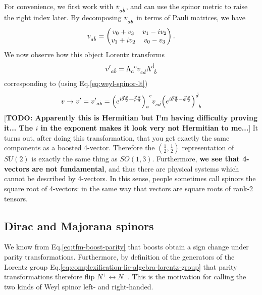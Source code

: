 \documentclass[11pt]{article}
\numberwithin{equation}{section}
\newcommand{\tn}[2]{\tensor{#1}{#2}}
\begin{document}
For convenience, we first work with $\tn{v}{_a_{\dot{b}}}$, and can use the spinor metric to raise the right index later. By decomposing $\tn{v}{_a_{\dot{b}}}$ in terms of Pauli matrices, we have
\begin{equation}
\tn{v}{_a_{\dot{b}}} = \begin{pmatrix}
v_0 + v_3 & v_1 - i v_2 \\
v_1 + i v_2 & v_0 - v_3
\end{pmatrix}.
\end{equation}
We now observe how this object Lorentz transforms
\begin{equation}
\tn{{v'}}{_a_{\dot{b}}} = \tn{\Lambda}{_a^c} \tn{{v}}{_c_{\dot{d}}} \tn{\Lambda}{^{\dot{d}}_{\dot{b}}}
\end{equation}
corresponding to (using Eq.\eqref{eq:weyl-spinor-lt})
\begin{equation}
v \rightarrow v' = \tn{{v'}}{_a_{\dot{b}}} = \tn{{\left(e^{i \vec{\theta} \frac{\vec{\sigma}}{2} + \vec{\phi} \frac{\vec{\sigma}}{2}} \right)}}{_a^c} \tn{v}{_c_{\dot{d}}} \tn{{\left(e^{i \vec{\theta} \frac{\vec{\sigma}}{2} - \vec{\phi} \frac{\vec{\sigma}}{2}} \right)}}{^{\dot{d}}_{\dot{b}}} 
\end{equation}
[\textbf{TODO: Apparently this is Hermitian but I'm having difficulty proving it... The $i$ in the exponent makes it look very not Hermitian to me...}] It turns out, after doing this transformation, that you get exactly the same components as a boosted 4-vector. Therefore the $(\frac{1}{2},\frac{1}{2})$ representation of $SU(2)$ is exactly the same thing as $SO(1,3)$. Furthermore, \textbf{we see that 4-vectors are not fundamental}, and thus there are physical systems which cannot be described by 4-vectors. In this sense, people sometimes call spinors the square root of 4-vectors: in the same way that vectors are square roots of rank-2 tensors.

\subsection{Dirac and Majorana spinors}
We know from Eq.\eqref{eq:tfm-boost-parity} that boosts obtain a sign change under parity transformations. Furthermore, by definition of the generators of the Lorentz group Eq.\eqref{eq:complexification-lie-algebra-lorentz-group} that parity transformations therefore flip $N^+ \leftrightarrow N^-$. This is the motivation for calling the two kinds of Weyl spinor left- and right-handed.
\end{document}

